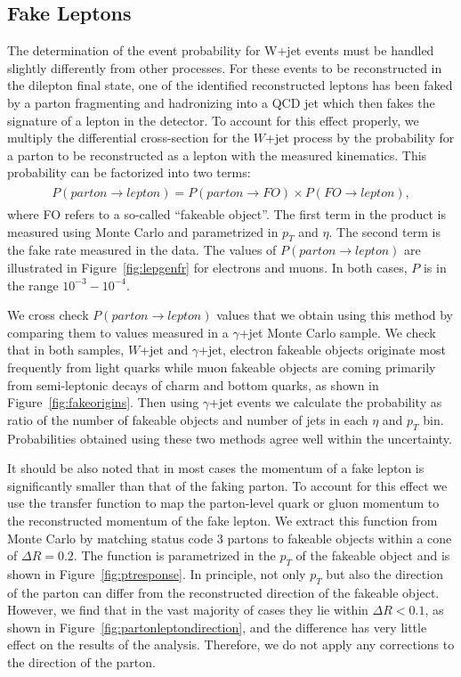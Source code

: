 \documentclass{cmspaper}
\begin{document}
\subsection{Fake Leptons}
The determination of the event probability for W+jet events must be handled slightly differently from other processes.
For these events to be reconstructed in the dilepton final state, one of the identified reconstructed leptons has been
faked by a parton fragmenting and hadronizing into a QCD jet which then fakes the signature of a lepton in the detector. 
To account for this effect properly, we multiply the differential cross-section for the $W$+jet process by the 
probability for a parton to be reconstructed as a lepton with the measured kinematics. This probability can be 
factorized into two terms:
\begin{eqnarray}
\begin{array}{lcl}
P(parton\rightarrow lepton)=P(parton\rightarrow FO) \times P(FO\rightarrow lepton),
\end{array} 
\end{eqnarray} 
where FO refers to a so-called ``fakeable object''. The first term in the product is measured using Monte Carlo and 
parametrized in $p_{T}$ and $\eta$. The second term is the fake rate measured in the data. The values 
of $P(parton \rightarrow lepton)$ are illustrated in Figure~\ref{fig:lepgenfr} for electrons and muons.
In both cases, $P$ is in the range $10^{-3}-10^{-4}$.

We cross check $P(parton \rightarrow lepton)$ values that we obtain using this method by comparing them to values 
measured in a $\gamma$+jet Monte Carlo sample.  We check that in both samples, $W$+jet and  $\gamma$+jet,
electron fakeable objects originate most frequently from light quarks while muon fakeable objects are coming primarily
from semi-leptonic decays of charm and bottom quarks, as shown in Figure~\ref{fig:fakeorigins}.
Then using  $\gamma$+jet events we calculate the probability as ratio of the number of fakeable objects and number of jets in each $\eta$ and $p_{T}$ bin.
Probabilities obtained using these two methods agree well within the uncertainty. 

It should be also noted that in most cases the momentum of a fake lepton is significantly smaller than that of the faking parton.
To account for this effect we use the transfer function to map the parton-level quark or gluon momentum to the reconstructed
momentum of the fake lepton.
We extract this function from Monte Carlo by matching status code 3 partons to fakeable objects within a
cone of $\Delta R=0.2$.
The function is parametrized in the $p_{T}$ of the fakeable object and is shown in Figure~\ref{fig:ptresponse}.
In principle, not only $p_{T}$ but also the direction of the parton can differ from the reconstructed direction of the fakeable object.
However, we find that in the vast majority of cases they lie within $\Delta R<0.1$, as shown in Figure~\ref{fig:partonleptondirection},
and the difference has very little effect on the results of the analysis. Therefore, we do not apply any corrections to the direction
of the parton.
\end{document}
